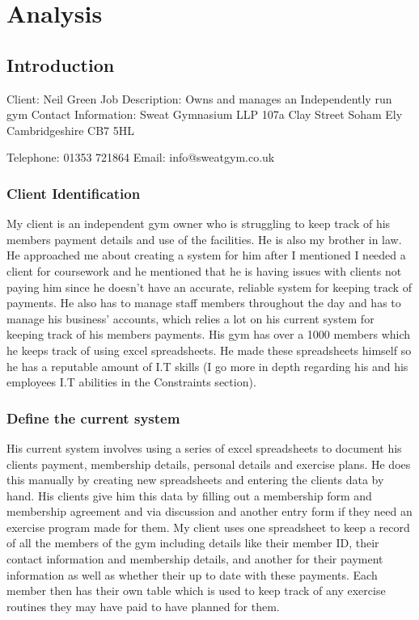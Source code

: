 \chapter{Analysis}

\section{Introduction}

Client: Neil Green
Job Description: Owns and manages an Independently run gym
Contact Information: Sweat Gymnasium LLP
					 107a Clay Street
					 Soham
					 Ely
					 Cambridgeshire
					 CB7 5HL

					 Telephone: 01353 721864
					 Email: info@sweatgym.co.uk

\subsection{Client Identification}

My client is an independent gym owner who is struggling to keep track of his members payment details and use of the facilities. He is also my brother in law. He approached me about creating a system for him after I mentioned I needed a client for coursework and he mentioned that he is having issues with clients not paying him since he doesn't have an accurate, reliable system for keeping track of payments. He also has to manage staff members throughout the day and has to manage his business' accounts, which relies a lot on his current system for keeping track of his members payments.  His gym has over a 1000 members which he keeps track of using excel spreadsheets. He made these spreadsheets himself so he has a reputable amount of I.T skills (I go more in depth regarding his and his employees I.T abilities in the Constraints section). 

\subsection{Define the current system}

His current system involves using a series of excel spreadsheets to document his clients payment, membership details, personal details and exercise plans. He does this manually by creating new spreadsheets and entering the clients data by hand. His clients give him this data by filling out a membership form and membership agreement and via discussion and another entry form if they need an exercise program made for them. My client uses one spreadsheet to keep a record of all the members of the gym including details like their member ID, their contact information and membership details, and another for their payment information  as well as whether their up to date with these payments. Each member then has their own table which is used to keep track of any exercise routines they may have paid to have planned for them.  

